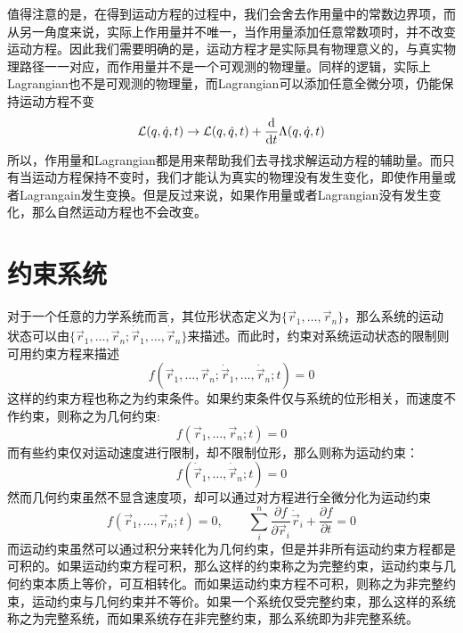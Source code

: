 值得注意的是，在得到运动方程的过程中，我们会舍去作用量中的常数边界项，而从另一角度来说，实际上作用量并不唯一，当作用量添加任意常数项时，并不改变运动方程。因此我们需要明确的是，运动方程才是实际具有物理意义的，与真实物理路径一一对应，而作用量并不是一个可观测的物理量。同样的逻辑，实际上Lagrangian也不是可观测的物理量，而Lagrangian可以添加任意全微分项，仍能保持运动方程不变
\begin{equation}
    \mathcal{L}(q,\dot q,t) \rightarrow \mathcal{L}(q,\dot q,t) + \frac{\mathrm{d} }{\mathrm{d} t}\Lambda(q,\dot q,t)
\end{equation}
所以，作用量和Lagrangian都是用来帮助我们去寻找求解运动方程的辅助量。而只有当运动方程保持不变时，我们才能认为真实的物理没有发生变化，即使作用量或者Lagrangain发生变换。但是反过来说，如果作用量或者Lagrangian没有发生变化，那么自然运动方程也不会改变。
\section{约束系统}
\label{sec:constraint}
对于一个任意的力学系统而言，其位形状态定义为$\{\vec r_1, \dots,\vec r_n\}$，那么系统的运动状态可以由$\{\vec r_1, \dots,\vec r_n;\dot{\vec{r}}_1, \dots,\dot{\vec{r}}_n\}$来描述。而此时，约束对系统运动状态的限制则可用约束方程来描述
\begin{equation}
    f(\vec r_1, \dots,\vec r_n;\dot{\vec{r}}_1, \dots,\dot{\vec{r}}_n;t)=0
\end{equation}
这样的约束方程也称之为约束条件。如果约束条件仅与系统的位形相关，而速度不作约束，则称之为几何约束:
\begin{equation}
    f(\vec r_1, \dots,\vec r_n;t)=0
\end{equation}
而有些约束仅对运动速度进行限制，却不限制位形，那么则称为运动约束：
\begin{equation}
    f(\dot{\vec{r}}_1, \dots,\dot{\vec{r}}_n;t)=0
\end{equation}
然而几何约束虽然不显含速度项，却可以通过对方程进行全微分化为运动约束
\begin{equation}
    f(\vec r_1, \dots,\vec r_n;t)=0,\qquad \sum_i^n \frac{\partial f}{\partial \vec{r}_i} \dot{\vec{r}}_i + \frac{\partial f}{\partial t} = 0
\end{equation}
而运动约束虽然可以通过积分来转化为几何约束，但是并非所有运动约束方程都是可积的。如果运动约束方程可积，那么这样的约束称之为完整约束，运动约束与几何约束本质上等价，可互相转化。而如果运动约束方程不可积，则称之为非完整约束，运动约束与几何约束并不等价。如果一个系统仅受完整约束，那么这样的系统称之为完整系统，而如果系统存在非完整约束，那么系统即为非完整系统。

